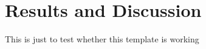 \chapter{Results and Discussion}\label{ch:results}

This is just to test whether this template is working


